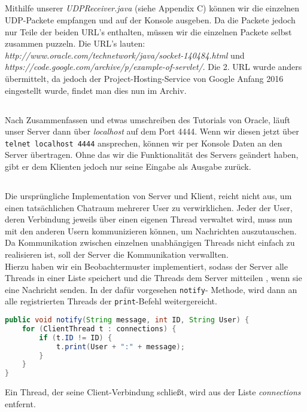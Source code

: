 \documentclass{scrartcl}
\begin{document}
    \subsection{}
    \label{sub:5.1}
      Mithilfe unserer \textit{UDPReceiver.java} (siehe Appendix C) können wir
      die einzelnen UDP-Packete empfangen und auf der Konsole ausgeben.
      Da die Packete jedoch nur Teile der beiden URL's enthalten, müssen wir
      die einzelnen Packete selbst zusammen puzzeln. Die URL's lauten:
      \textit{http://www.oracle.com/technetwork/java/socket-140484.html} und\\
      \textit{https://code.google.com/archive/p/example-of-servlet/}. Die
      2. URL wurde anders übermittelt, da jedoch der Project-Hosting-Service
      von Google Anfang 2016 eingestellt wurde, findet man dies nun im Archiv.
    \subsection{}
    \label{sub:5.2}
      Nach Zusammenfassen und etwas umschreiben des Tutorials von Oracle, läuft
      unser Server dann über \textit{localhost} auf dem Port 4444. Wenn wir
      diesen jetzt über \texttt{telnet localhost 4444} ansprechen, können
      wir per Konsole Daten an den Server übertragen. Ohne das wir die
      Funktionalität des Servers geändert haben, gibt er dem Klienten jedoch
      nur seine Eingabe als Ausgabe zurück.
    \subsection{}
    \label{sub:5.3}
      Die ursprüngliche Implementation von Server und Klient, reicht nicht aus,
      um einen tatsächlichen Chatraum mehrerer User zu verwirklichen.
      Jeder der User, deren Verbindung jeweils über einen eigenen Thread
      verwaltet wird, muss nun mit den anderen Usern kommunizieren können,
      um Nachrichten auszutauschen. Da Kommunikation zwischen einzelnen
      unabhängigen Threads nicht einfach zu realisieren ist, soll der Server
      die Kommunikation verwallten.\\
      Hierzu haben wir ein Beobachtermuster implementiert, sodass der Server
      alle Threads in einer Liste speichert und die Threads dem Server mitteilen
      , wenn sie eine Nachricht senden. In der dafür vorgesehen \texttt{notify}-
      Methode, wird dann an alle registrierten Threads der \texttt{print}-Befehl
      weitergereicht.
      \begin{lstlisting}[language=java]
public void notify(String message, int ID, String User) {
	for (ClientThread t : connections) {
		if (t.ID != ID) {
			t.print(User + ":" + message);
		}
	}
}
      \end{lstlisting}
      Ein Thread, der seine Client-Verbindung schließt, wird aus der Liste
      \textit{connections} entfernt.
\end{document}
